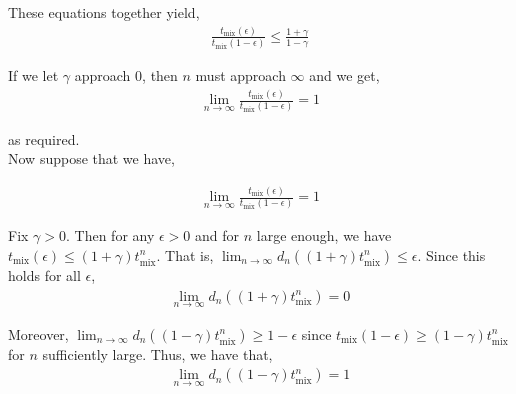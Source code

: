 \documentclass[12pt]{article}
\begin{document}
These equations together yield,
\begin{align*}
\frac{t_{\text{mix}}(\epsilon)}{t_{\text{mix}}(1 - \epsilon)} \leq \frac{1 + \gamma}{1 - \gamma}
\end{align*}

If we let $\gamma$ approach $0$, then $n$ must approach $\infty$ and we get,
\begin{align*}
\lim_{n \to \infty} \frac{t_{\text{mix}}(\epsilon)}{t_{\text{mix}}(1 - \epsilon)} = 1
\end{align*}

as required.\\

Now suppose that we have,

\begin{align*}
\lim_{n \to \infty} \frac{t_{\text{mix}}(\epsilon)}{t_{\text{mix}}(1 - \epsilon)} = 1
\end{align*}

Fix $\gamma > 0$. Then for any $\epsilon > 0$ and for $n$ large enough, we have $t_{\text{mix}}(\epsilon) \leq (1 + \gamma)t^n_{\text{mix}}$. That is, $\lim_{n \to \infty} d_n((1 + \gamma)t^n_{\text{mix}}) \leq \epsilon$. Since this holds for all $\epsilon$,
\begin{align*}
\lim_{n \to \infty} d_n ((1 + \gamma)t^n_{\text{mix}}) = 0
\end{align*}

Moreover, $\lim_{n \to \infty} d_n ((1 - \gamma) t^n_{\text{mix}}) \geq 1 - \epsilon$ since $t_{\text{mix}}(1-\epsilon) \geq (1 - \gamma)t^n_{\text{mix}}$ for $n$ sufficiently large. Thus, we have that,
\begin{align*}
\lim_{n \to \infty} d_n ((1 - \gamma) t^n_{\text{mix}}) = 1
\end{align*}
\end{document}
